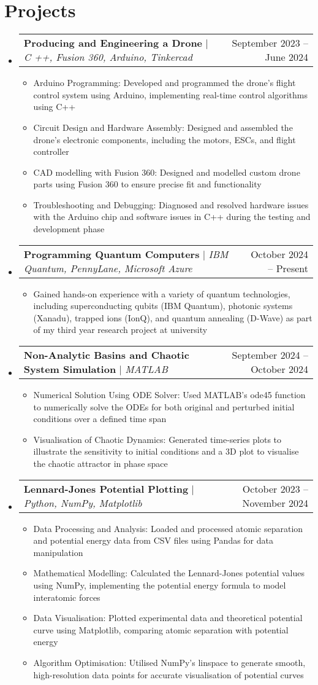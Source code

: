 \documentclass[letterpaper,11pt]{article}
\makeatletter
\newcommand{\resumeItem}[1]{
  \item\small{
    {#1 \vspace{-2pt}}
  }
}
\newcommand{\resumeProjectHeading}[2]{
    \item
    \begin{tabular*}{0.97\textwidth}{l@{\extracolsep{\fill}}r}
      \small#1 & #2 \\
    \end{tabular*}\vspace{-7pt}
}
\newcommand{\resumeSubHeadingListStart}{\begin{itemize}[leftmargin=0.15in, label={}]}
\newcommand{\resumeSubHeadingListEnd}{\end{itemize}}
\newcommand{\resumeItemListStart}{\begin{itemize}}
\newcommand{\resumeItemListEnd}{\end{itemize}\vspace{-5pt}}
\makeatother
\begin{document}
\section{Projects}
    \resumeSubHeadingListStart
          \resumeProjectHeading
          {\textbf{Producing and Engineering a Drone} $|$ \emph{C ++, Fusion 360, Arduino, Tinkercad}}{September 2023 -- June 2024}
          \resumeItemListStart
            \resumeItem{Arduino Programming: Developed and programmed the drone’s flight control system using Arduino, implementing real-time control algorithms using C++}
            \resumeItem{Circuit Design and Hardware Assembly: Designed and assembled the drone’s electronic components, including the motors, ESCs, and flight controller}
            \resumeItem{CAD modelling with Fusion 360: Designed and modelled custom drone parts using Fusion 360 to ensure precise fit and functionality }
            \resumeItem{Troubleshooting and Debugging: Diagnosed and resolved hardware issues with the Arduino chip and software issues in C++ during the testing and development phase}
          \resumeItemListEnd
          \resumeProjectHeading
          {\textbf{Programming Quantum Computers} $|$ \emph{IBM Quantum, PennyLane, Microsoft Azure}}{October 2024 -- Present}
          \resumeItemListStart
            \resumeItem{Gained hands-on experience with a variety of quantum technologies, including superconducting qubits (IBM Quantum), photonic systems (Xanadu), trapped ions (IonQ), and quantum annealing (D-Wave) as part of my third year research project at university}
          \resumeItemListEnd
            \resumeProjectHeading
          {\textbf{Non-Analytic Basins and Chaotic System Simulation} $|$ \emph{MATLAB}}{September 2024 -- October 2024}
          \resumeItemListStart
            \resumeItem{Numerical Solution Using ODE Solver: Used MATLAB’s ode45 function to numerically solve the ODEs for both original and perturbed initial conditions over a defined time span}
            \resumeItem{Visualisation of Chaotic Dynamics: Generated time-series plots to illustrate the sensitivity to initial conditions and a 3D plot to visualise the chaotic attractor in phase space}
          \resumeItemListEnd
      \resumeProjectHeading
          {\textbf{Lennard-Jones Potential Plotting} $|$ \emph{Python, NumPy, Matplotlib}}{October 2023 -- November 2024}
          \resumeItemListStart
            \resumeItem{Data Processing and Analysis: Loaded and processed atomic separation and potential energy data from CSV files using Pandas for data manipulation}
            \resumeItem{Mathematical Modelling: Calculated the Lennard-Jones potential values using NumPy, implementing the potential energy formula to model interatomic forces}
            \resumeItem{Data Visualisation: Plotted experimental data and theoretical potential curve using Matplotlib, comparing atomic separation with potential energy}
            \resumeItem{Algorithm Optimisation: Utilised NumPy's linspace to generate smooth, high-resolution data points for accurate visualisation of potential curves}
          \resumeItemListEnd
    \resumeSubHeadingListEnd
\end{document}
